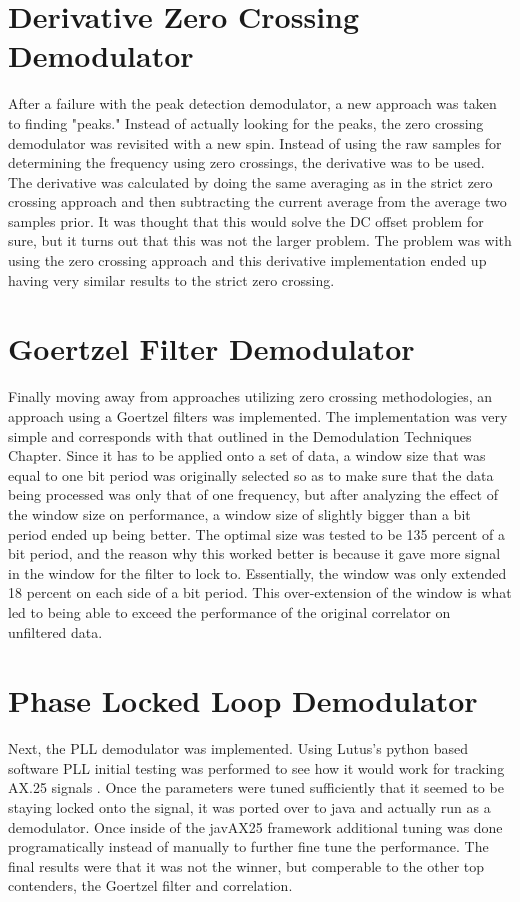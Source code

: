 \section{Derivative Zero Crossing Demodulator}
After a failure with the peak detection demodulator, a new approach was taken to finding "peaks." Instead of actually looking for the peaks, the zero crossing demodulator was revisited with a new spin. Instead of using the raw samples for determining the frequency using zero crossings, the derivative was to be used. The derivative was calculated by doing the same averaging as in the strict zero crossing approach and then subtracting the current average from the average two samples prior. It was thought that this would solve the DC offset problem for sure, but it turns out that this was not the larger problem. The problem was with using the zero crossing approach and this derivative implementation ended up having very similar results to the strict zero crossing.

\section{Goertzel Filter Demodulator}
Finally moving away from approaches utilizing zero crossing methodologies, an approach using a Goertzel filters was implemented. The implementation was very simple and corresponds with that outlined in the Demodulation Techniques Chapter. Since it has to be applied onto a set of data, a window size that was equal to one bit period was originally selected so as to make sure that the data being processed was only that of one frequency, but after analyzing the effect of the window size on performance, a window size of slightly bigger than a bit period ended up being better. The optimal size was tested to be 135 percent of a bit period, and the reason why this worked better is because it gave more signal in the window for the filter to lock to. Essentially, the window was only extended 18 percent on each side of a bit period. This over-extension of the window is what led to being able to exceed the performance of the original correlator on unfiltered data.

\section{Phase Locked Loop Demodulator}
Next, the PLL demodulator was implemented. Using Lutus's python based software PLL initial testing was performed to see how it would work for tracking AX.25 signals \cite{Lutus2011}. Once the parameters were tuned sufficiently that it seemed to be staying locked onto the signal, it was ported over to java and actually run as a demodulator. Once inside of the javAX25 framework additional tuning was done programatically instead of manually to further fine tune the performance. The final results were that it was not the winner, but comperable to the other top contenders, the Goertzel filter and correlation.

